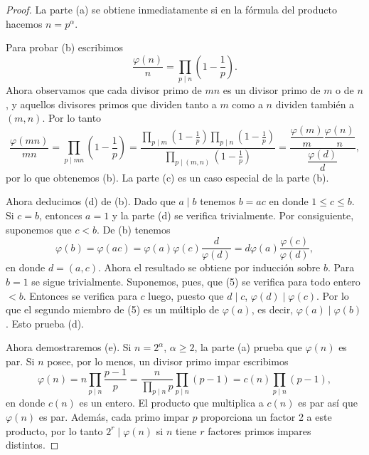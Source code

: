 \documentclass[12pt,a4paper]{book}
\begin{document}
    \begin{proof}
        La parte (a) se obtiene inmediatamente si en la fórmula del producto hacemos
        $n=p^\alpha$.

        Para probar (b) escribimos
        \begin{equation*}
            \frac{\varphi(n)}{n}=\prod_{p\mid n}\left(1-\frac{1}{p}\right).
        \end{equation*}
        Ahora observamos que cada divisor primo de $mn$ es un divisor primo de $m$ o de $n$,
        y aquellos divisores primos que dividen tanto a $m$ como a $n$ dividen también a
        $(m,n)$. Por lo tanto
        \begin{equation*}
            \frac{\varphi(mn)}{mn}=\prod_{p\mid mn}\left(1-\frac{1}{p}\right)
            =\frac{\displaystyle\prod_{p\mid m}\left(1-\frac{1}{p}\right)
            \prod_{p\mid n}\left(1-\frac{1}{p}\right)}{\displaystyle\prod_{p\mid(m,n)}
            \left(1-\frac{1}{p}\right)}
            =\frac{\dfrac{\varphi(m)}{m}\dfrac{\varphi(n)}{n}}{\dfrac{\varphi(d)}{d}},
        \end{equation*}
        por lo que obtenemos (b). La parte (c) es un caso especial de la parte (b).

        Ahora deducimos (d) de (b). Dado que $a\mid b$ tenemos $b=ac$ en donde
        $1\leq c\leq b$. Si $c=b$, entonces $a=1$ y la parte (d) se verifica trivialmente.
        Por consiguiente, suponemos que $c<b$. De (b) tenemos
        \begin{equation}
            \varphi(b)=\varphi(ac)=\varphi(a)\varphi(c)\frac{d}{\varphi(d)}
            =d\varphi(a)\frac{\varphi(c)}{\varphi(d)},
        \end{equation}
        en donde $d=(a,c)$. Ahora el resultado se obtiene por inducción sobre $b$. Para
        $b=1$ se sigue trivialmente. Suponemos, pues, que (5) se verifica para todo entero
        $<b$. Entonces se verifica para $c$ luego, puesto que $d\mid c$, $\varphi(d)\mid
        \varphi(c)$. Por lo que el segundo miembro de (5) es un múltiplo de $\varphi(a)$, es
        decir, $\varphi(a)\mid\varphi(b)$. Esto prueba (d).

        Ahora demostraremos (e). Si $n=2^\alpha$, $\alpha\geq2$, la parte (a) prueba que
        $\varphi(n)$ es par. Si $n$ posee, por lo menos, un divisor primo impar escribimos
        \begin{equation*}
            \varphi(n)=n\prod_{p\mid n}\frac{p-1}{p}
            =\frac{n}{\displaystyle\prod_{p\mid n}p}\prod_{p\mid n}(p-1)=c(n)\prod_{p\mid n}(p-1),
        \end{equation*}
        en donde $c(n)$ es un entero. El producto que multiplica a $c(n)$ es par así que
        $\varphi(n)$ es par. Además, cada primo impar $p$ proporciona un factor 2 a este
        producto, por lo tanto $2^r\mid\varphi(n)$ si $n$ tiene $r$ factores primos impares
        distintos.
    \end{proof}
\end{document}
